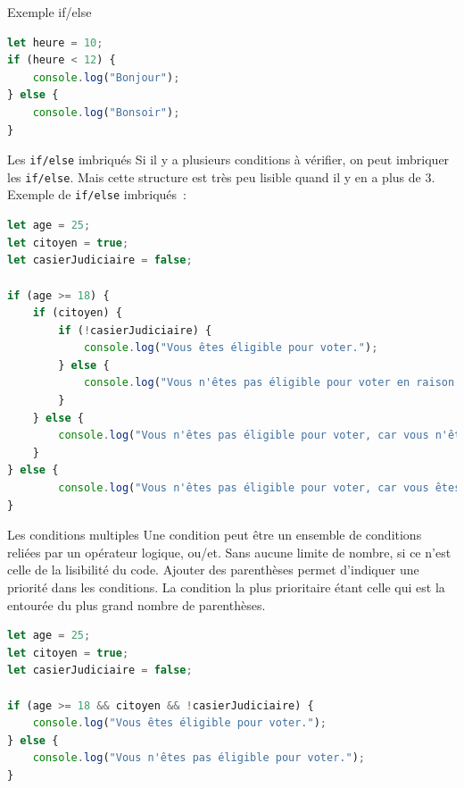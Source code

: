 \documentclass{beamer}
\begin{document}
    \begin{frame}[fragile]{Exemple if/else}
        \begin{lstlisting}[language=JavaScript,title={\scriptsize{Script JavaScript}}]
let heure = 10;
if (heure < 12) {
    console.log("Bonjour");
} else {
    console.log("Bonsoir");
}
        \end{lstlisting}
    \end{frame}

    \begin{frame}[fragile]{Les \lstinline{if/else} imbriqués}
        Si il y a plusieurs conditions à vérifier, on peut imbriquer les \lstinline{if/else}.
        \bigbreak
        Mais cette structure est très peu lisible quand il y en a plus de 3.
        Exemple de \lstinline{if/else} imbriqués~:
        \begin{lstlisting}[language=JavaScript,title={\scriptsize{Script JavaScript}},basicstyle=\tiny\ttfamily]
let age = 25;
let citoyen = true;
let casierJudiciaire = false;

if (age >= 18) {
    if (citoyen) {
        if (!casierJudiciaire) {
            console.log("Vous êtes éligible pour voter.");
        } else {
            console.log("Vous n'êtes pas éligible pour voter en raison de votre casier judiciaire.");
        }
    } else {
        console.log("Vous n'êtes pas éligible pour voter, car vous n'êtes pas citoyen.");
    }
} else {
        console.log("Vous n'êtes pas éligible pour voter, car vous êtes mineur.");
}
        \end{lstlisting}
    \end{frame}

    \begin{frame}[fragile]{Les conditions multiples}
        Une condition peut être un ensemble de conditions reliées par un opérateur logique, ou/et.
        Sans aucune limite de nombre, si ce n'est celle de la lisibilité du code.
        \bigbreak
        Ajouter des parenthèses permet d'indiquer une priorité dans les conditions.
        La condition la plus prioritaire étant celle qui est la entourée du plus grand nombre de parenthèses.
        \begin{lstlisting}[language=JavaScript,title={\scriptsize{Script JavaScript}}]
let age = 25;
let citoyen = true;
let casierJudiciaire = false;

if (age >= 18 && citoyen && !casierJudiciaire) {
    console.log("Vous êtes éligible pour voter.");
} else {
    console.log("Vous n'êtes pas éligible pour voter.");
}
        \end{lstlisting}
    \end{frame}
\end{document}
